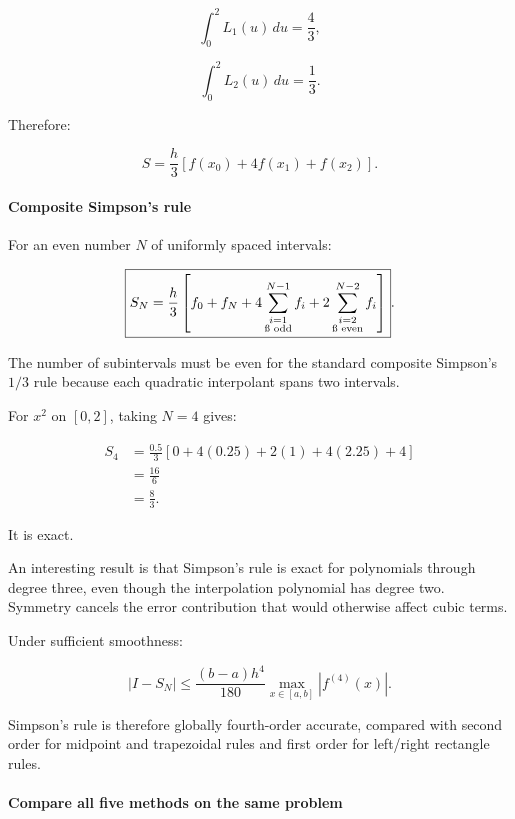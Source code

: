 \[
\int_0^2L_1(u)\,du=\frac43,
\]

\[
\int_0^2L_2(u)\,du=\frac13.
\]

Therefore:

\[
S=\frac h3[f(x_0)+4f(x_1)+f(x_2)].
\]

\paragraph{Composite Simpson's rule}\label{02-foundations-ii-ch022-composite-simpsons-rule}

For an even number \(N\) of uniformly spaced intervals:

\[
\boxed{ S_N= \frac h3 \left[ f_0+f_N+ 4\sum_{\substack{i=1\\\i\text{ odd}}}^{N-1}f_i+ 2\sum_{\substack{i=2\\\i\text{ even}}}^{N-2}f_i \right] }.
\]

The number of subintervals must be even for the standard composite Simpson's \(1/3\) rule because each quadratic interpolant spans two intervals.

For \(x^2\) on \([0,2]\), taking \(N=4\) gives:

\[
\begin{aligned} S_4 &=\frac{0.5}{3} [0+4(0.25)+2(1)+4(2.25)+4]\\ &=\frac{16}{6}\\ &=\boxed{\frac83}. \end{aligned}
\]

It is exact.

An interesting result is that Simpson's rule is exact for polynomials through degree three, even though the interpolation polynomial has degree two. Symmetry cancels the error contribution that would otherwise affect cubic terms.

Under sufficient smoothness:

\[
\boxed{ |I-S_N| \le \frac{(b-a)h^4}{180} \max_{x\in[a,b]}|f^{(4)}(x)| }.
\]

Simpson's rule is therefore globally fourth-order accurate, compared with second order for midpoint and trapezoidal rules and first order for left/right rectangle rules.

\paragraph{Compare all five methods on the same problem}\label{02-foundations-ii-ch022-compare-all-five-methods-on-the-same-problem}

